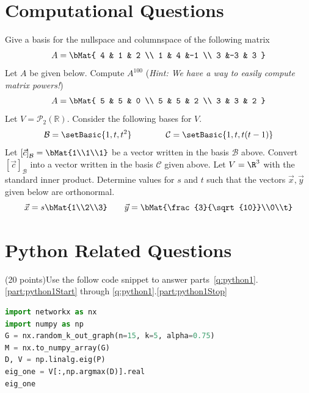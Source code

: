 \documentclass[12pt,addpoints]{exam}
\newcommand{\bCoord}[2]{\left[#1\right]_{#2}}
\newcommand{\Cb}{\mathcal{C}}
\renewcommand{\P}[1]{\mathcal{P}_{#1}\left(\mathbb{R}\right)}
\renewcommand{\B}{\mathcal{B}}
\begin{document}
\begin{questions}
        \section*{Computational Questions}
        \question[15] Give a basis for the nullspace and columnspace of the following matrix
        \[
            A = \bMat{
                4 & 1 & 2 \\
                1 & 4 &-1 \\
                3 &-3 & 3
            }
        \]
        \vfill
        \newpage
        \question[15] Let $A$ be given below. Compute $A^{100}$ (\emph{Hint: We have a way to easily compute
        matrix powers!})
        \[
            A = \bMat{
                5 & 5 & 0 \\
                5 & 5 & 2 \\
                3 & 3 & 2
            }
        \]
        \vfill
        \newpage
        \question[15] Let $V= \P{2}$. Consider the following bases for $V$.
        \[
            \B = \setBasic{1,t,t^2}\qquad\qquad\Cb =\setBasic{1, t, t(t-1)}
        \]
        Let $\bCoord{\vec{c}}{\B} = \bMat{1\\1\\1}$  be a vector written in the basis $\B$ above.
        Convert $\bCoord{\vec{c}}{\B}$ into a vector written in the basis $\Cb$ given above.
        \newpage
        \question[20] Let $V=\R^3$ with the standard inner product. Determine values for $s$ and
        $t$ such that the vectors $\vec{x},\vec{y}$ given below are orthonormal.
        \[
            \vec{x} = s\bMat{1\\2\\3}\qquad\vec{y} = \bMat{\frac{3}{\sqrt{10}}\\0\\t}
        \]
        \newpage
        \section*{Python Related Questions}
        \question\label{q:python1} (20 points)Use the follow code snippet to answer
        parts~\ref{q:python1}.\ref{part:python1Start} through \ref{q:python1}.\ref{part:python1Stop}
        \begin{lstlisting}[language=Python]
import networkx as nx
import numpy as np
G = nx.random_k_out_graph(n=15, k=5, alpha=0.75)
M = nx.to_numpy_array(G)
D, V = np.linalg.eig(P)
eig_one = V[:,np.argmax(D)].real
eig_one
        \end{lstlisting}
        \begin{parts}

\end{parts}
\end{questions}
\end{document}
